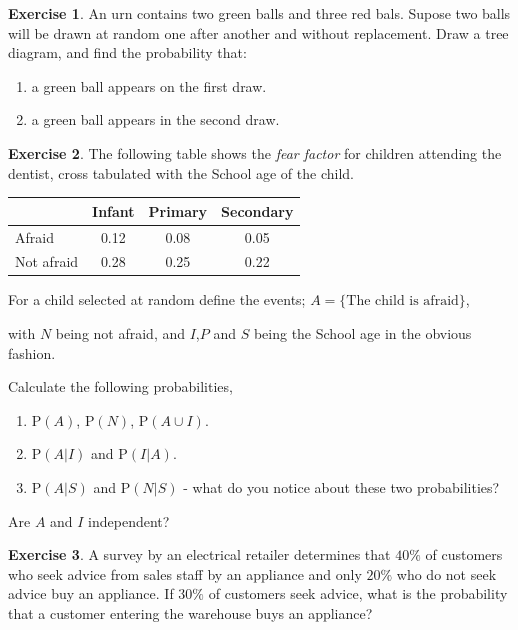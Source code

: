 \documentclass[
]{book}
\theoremstyle{definition}
\theoremstyle{definition}
\theoremstyle{definition}
\newtheorem{exercise}{Exercise}[chapter]
\theoremstyle{definition}
\theoremstyle{remark}
\begin{document}
\begin{exercise}

An urn contains two green balls and three red bals. Supose two balls will be drawn at random one after another and without replacement. Draw a tree diagram, and find the probability that:

\begin{enumerate}
\def\labelenumi{\alph{enumi})}
\item
  a green ball appears on the first draw.
\item
  a green ball appears in the second draw.
\end{enumerate}

\end{exercise}

\begin{exercise}
The following table shows the \emph{fear factor} for children attending the dentist, cross tabulated with the School age of the child.

\begin{longtable}[]{@{}lccc@{}}
\toprule
& Infant & Primary & Secondary\tabularnewline
\midrule
\endhead
Afraid & 0.12 & 0.08 & 0.05\tabularnewline
Not afraid & 0.28 & 0.25 & 0.22\tabularnewline
\bottomrule
\end{longtable}

For a child selected at random define the events; \(A = \{ \text{The child is afraid} \}\),

with \(N\) being not afraid, and \(I\),\(P\) and \(S\) being the School age in the obvious fashion.

Calculate the following probabilities,

\begin{enumerate}
\def\labelenumi{\alph{enumi})}
\item
  \(\text{P}(A)\), \(\text{P}(N)\), \(\text{P}(A\cup I)\).
\item
  \(\text{P}(A| I)\) and \(\text{P}(I| A)\).
\item
  \(\text{P}(A| S)\) and \(\text{P}(N| S)\) - what do you notice about these two probabilities?
\end{enumerate}

Are \(A\) and \(I\) independent?
\end{exercise}

\begin{exercise}
A survey by an electrical retailer determines that \(40\%\) of customers who seek advice from sales staff by an appliance and only \(20\%\) who do not seek advice buy an appliance. If \(30\%\) of customers seek advice, what is the probability that a customer entering the warehouse buys an appliance?
\end{exercise}
\end{document}
